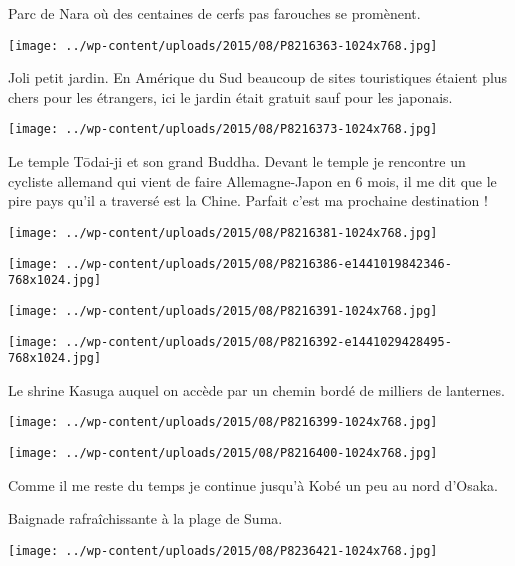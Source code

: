  Parc de Nara où des centaines de cerfs pas farouches se promènent.
\begin{center} \texttt{[image: ../wp-content/uploads/2015/08/P8216363-1024x768.jpg]} \end{center}

\pagebreak
 Joli petit jardin. En Amérique du Sud beaucoup de sites touristiques étaient plus chers pour les étrangers, ici le jardin était gratuit sauf pour les japonais. 
\begin{center} \texttt{[image: ../wp-content/uploads/2015/08/P8216373-1024x768.jpg]} \end{center}

 Le temple Tōdai-ji et son grand Buddha. Devant le temple je rencontre un cycliste allemand qui vient de faire Allemagne-Japon en 6 mois, il me dit que le pire pays qu'il a traversé est la Chine. Parfait c'est ma prochaine destination !
\begin{center} \texttt{[image: ../wp-content/uploads/2015/08/P8216381-1024x768.jpg]} \end{center}
\begin{center} \texttt{[image: ../wp-content/uploads/2015/08/P8216386-e1441019842346-768x1024.jpg]} \end{center}
\begin{center} \texttt{[image: ../wp-content/uploads/2015/08/P8216391-1024x768.jpg]} \end{center}
 \begin{center} \texttt{[image: ../wp-content/uploads/2015/08/P8216392-e1441029428495-768x1024.jpg]} \end{center}

 Le shrine Kasuga auquel on accède par un chemin bordé de milliers de lanternes.
\begin{center} \texttt{[image: ../wp-content/uploads/2015/08/P8216399-1024x768.jpg]} \end{center}
\begin{center} \texttt{[image: ../wp-content/uploads/2015/08/P8216400-1024x768.jpg]} \end{center}

 Comme il me reste du temps je continue jusqu'à Kobé un peu au nord d'Osaka. 

 Baignade rafraîchissante à la plage de Suma.
\begin{center} \texttt{[image: ../wp-content/uploads/2015/08/P8236421-1024x768.jpg]} \end{center}


